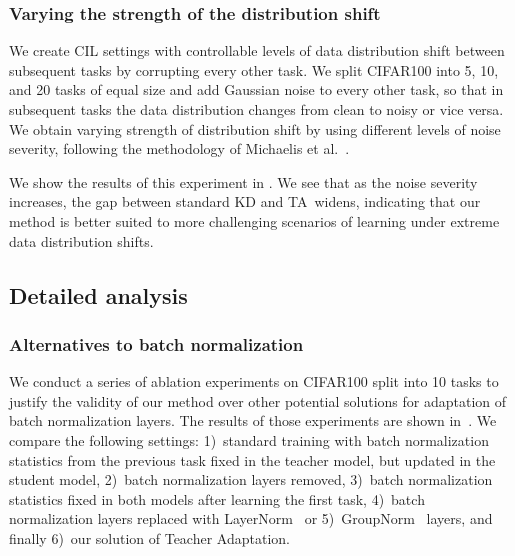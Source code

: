 \documentclass[10pt,twocolumn,letterpaper]{article}
\newcommand\rev[1]{{#1}}
\newcommand\ta{TA}
\begin{document}
\subsubsection{Varying the strength of the distribution shift}
\label{sec:exp:corruptions}

We create CIL settings with controllable levels of data distribution shift between subsequent tasks by corrupting every other task. We split CIFAR100 into 5, 10, and 20 tasks of equal size and add Gaussian noise to every other task, so that in subsequent tasks the data distribution changes from clean to noisy or vice versa. We obtain varying strength of distribution shift by using different levels of noise severity, following the methodology of Michaelis et al.~\cite{michaelis2019dragon}.

We show the results of this experiment in . We see that as the noise severity increases, the gap between standard KD and \ta\ widens, indicating that our method is better suited to more challenging scenarios of learning under extreme data distribution shifts.

\subsection{Detailed analysis}
\label{sec:exp:bn_ablations}



\subsubsection{Alternatives to batch normalization} We conduct a series of ablation experiments on CIFAR100 split into 10 tasks to justify the validity of our method over other potential solutions for adaptation of batch normalization layers. The results of those experiments are shown in~. We compare the following settings: 1)~standard training with batch normalization statistics from the previous task fixed in the teacher model, but updated in the student model,  2)~batch normalization layers removed, 3)~batch normalization statistics fixed in both models after learning the first task, 4)~batch normalization layers replaced with LayerNorm~\cite{ba2016layer} \rev{or 5)~GroupNorm~\cite{wu2018group} layers,} and finally 6)~our solution of Teacher Adaptation. 
\end{document}

